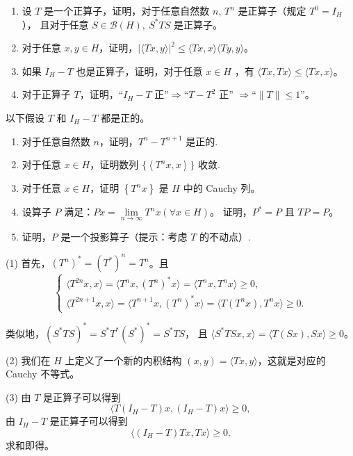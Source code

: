 \begin{enumerate}
\begin{enumerate}[label=(\arabic*)]
\item 设 $T$ 是一个正算子，证明，对于任意自然数 $n$, $T^{n}$ 是正算子（规定 $T^{0}=I_{H}$），
且对于任意 $S \in \mathcal{B}(H), ~ S^{*} T S$ 是正算子。
\item 对于任意 $x, y \in H$，证明，$|\langle T x, y\rangle|^{2} \leqslant\langle T x, x\rangle\langle T y, y\rangle$。
\item 如果 $I_{H}-T$ 也是正算子，证明，对于任意 $x \in H$ ，有 $\langle T x, T x\rangle \leqslant\langle T x, x\rangle$。
\item 对于正算子 $T$，证明，``$I_{H}-T$ 正''$\Longrightarrow$``$T-T^{2}$ 正''
$\Longrightarrow$``$\|T\| \leqslant 1$''。
\end{enumerate}
以下假设 $T$ 和 $I_{H}-T$ 都是正的。
\begin{enumerate}[label=(\arabic*)]
\item 对于任意自然数 $n$，证明，$T^{n}-T^{n+1}$ 是正的.
\item 对于任意 $x \in H$，证明数列 $\{\left\langle T^{n} x, x\right\rangle\}$ 收敛.
\item 对于任意 $x \in H$，证明 $\left\{T^{n} x\right\}$ 是 $H$ 中的 Cauchy 列。
\item 设算子 $P$ 满足：$P x=\lim \limits_{n \rightarrow \infty} T^{n} x(\forall x \in H)$。
证明，$P^{*}=P$ 且 $T P=P$。
\item 证明，$P$ 是一个投影算子（提示：考虑 $T$ 的不动点）.
\end{enumerate}
\begin{proofc}
(1) 首先，$(T^{n})^{*}=(T^{*})^{n}=T^{n}$。且
$$\begin{cases}
\langle T^{2n} x, x\rangle=\langle T^{n} x,(T^{n})^{*} x\rangle
=\langle T^{n} x, T^{n} x\rangle \geqslant 0, \\
\langle T^{2n+1} x, x\rangle=\langle T^{n+1} x,(T^{n})^{*} x\rangle
=\langle T(T^{n} x), T^{n} x\rangle \geqslant 0.
\end{cases}$$

类似地，$(S^{*} T S)^{*}=S^{*} T^{*}(S^{*})^{*}=S^{*} T S$，
且 $\langle S^{*} T S x, x\rangle=\langle T(S x), S x\rangle \geqslant 0$。

(2) 我们在 $H$ 上定义了一个新的内积结构 $(x, y)=\langle T x, y\rangle$，这就是对应的 Cauchy 不等式。

(3) 由 $T$ 是正算子可以得到
$$\langle T(I_{H}-T) x,(I_{H}-T) x\rangle \geqslant 0,$$
由 $I_{H}-T$ 是正算子可以得到
$$\langle(I_{H}-T) T x, T x\rangle \geqslant 0.$$
求和即得。


\end{proofc}
\end{enumerate}
